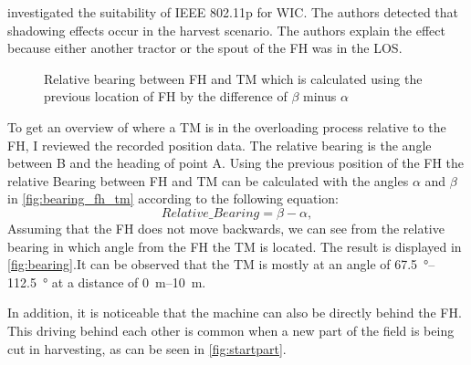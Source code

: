 \documentclass[]{nsm-thesis}
\begin{document}
\textcite{klingler_agriculture_2018} investigated the suitability of IEEE 802.11p for \ac{WIC}. The authors detected that shadowing effects occur in the harvest scenario. The authors explain the effect because either another tractor or the spout of the \ac{FH} was in the \ac{LOS}.  
\begin{figure}%
	\centering
	\caption{Relative bearing between \ac{FH} and \ac{TM} which is calculated using the previous location of \ac{FH} by the difference of $\beta$ minus $\alpha$}%
	\label{fig:bearing_fh_tm}%
\end{figure}
To get an overview of where a \ac{TM} is in the overloading process relative to the \ac{FH}, I reviewed the recorded position data. The relative bearing is the angle between B and the heading of point A. Using the previous position of the \ac{FH} the relative Bearing between \ac{FH} and \ac{TM} can be calculated with the angles $\alpha$ and $\beta$ in \autoref{fig:bearing_fh_tm} according to the following equation:
\begin{equation}\label{eq:RelativeBearing}
	Relative\_Bearing = \beta - \alpha	,
\end{equation}
Assuming that the \ac{FH} does not move backwards, we can see from the relative bearing in which angle from the \ac{FH} the \ac{TM} is located. The result is displayed in \autoref{fig:bearing}.It can be observed that the TM is mostly at an angle of \SIrange{67.5}{112.5}{\degree} at a distance of \SIrange{0}{10}{\metre}. 

In addition, it is noticeable that the machine can also be directly behind the \ac{FH}. This driving behind each other is common when a new part of the field is being cut in harvesting, as can be seen in \autoref{fig:startpart}.
\end{document}
